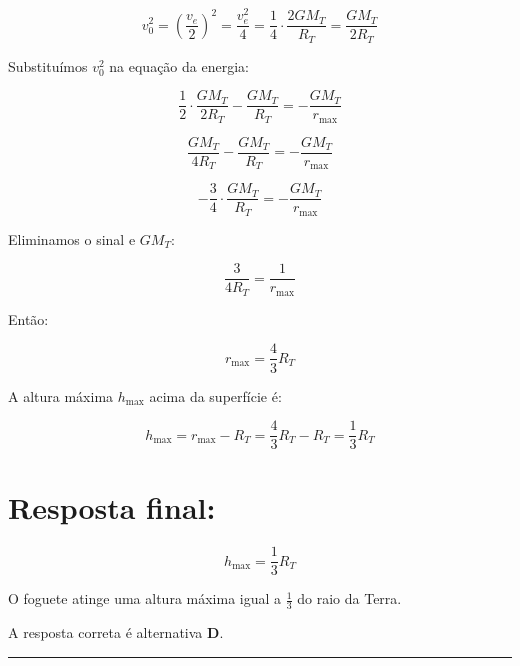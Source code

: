 \documentclass[a4paper,12pt]{article}
\begin{document}
\begin{flushleft}
\[
v_0^2 = \left( \frac{v_e}{2} \right)^2 = \frac{v_e^2}{4} = \frac{1}{4} \cdot \frac{2 G M_T}{R_T} = \frac{G M_T}{2 R_T}
\]

Substituímos \(v_0^2\) na equação da energia:

\[
\frac{1}{2} \cdot \frac{G M_T}{2 R_T} - \frac{G M_T}{R_T} = - \frac{G M_T}{r_{\text{max}}}
\]

\[
\frac{G M_T}{4 R_T} - \frac{G M_T}{R_T} = - \frac{G M_T}{r_{\text{max}}}
\]

\[
-\frac{3}{4} \cdot \frac{G M_T}{R_T} = - \frac{G M_T}{r_{\text{max}}}
\]

Eliminamos o sinal e \(G M_T\):

\[
\frac{3}{4 R_T} = \frac{1}{r_{\text{max}}}
\]

Então:

\[
r_{\text{max}} = \frac{4}{3} R_T
\]

A altura máxima \(h_{\text{max}}\) acima da superfície é:

\[
h_{\text{max}} = r_{\text{max}} - R_T = \frac{4}{3} R_T - R_T = \frac{1}{3} R_T
\]

\section*{Resposta final:}

\[
\boxed{h_{\text{max}} = \frac{1}{3} R_T}
\]

O foguete atinge uma altura máxima igual a \(\frac{1}{3}\) do raio da Terra.


A resposta correta é alternativa \colorbox{green!50}{\textbf{D}}.
\end{flushleft}

\noindent\rule{\linewidth}{0.6pt}\\
\end{document}

